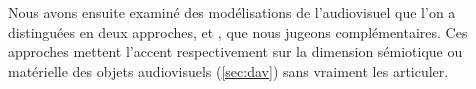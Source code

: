 Nous avons ensuite examiné des modélisations de l'audiovisuel que l'on a distinguées en deux approches,  et , que nous jugeons complémentaires. 
Ces approches mettent l'accent respectivement sur la dimension sémiotique ou matérielle des objets audiovisuels (\ref{sec:dav}) sans vraiment les articuler.
% 
